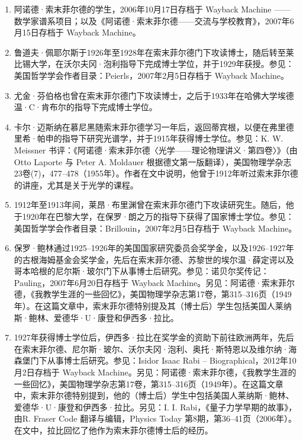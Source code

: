 \begin{enumerate}
\begin{itemize}
\item 博士与教授资格：卡尔·贝歇特、汉斯·贝特、彼得·德拜、保罗·彼得·埃瓦尔德、阿道夫·克拉策尔、威廉·伦茨、路德维希·瓦尔德曼、海因里希·韦尔克以及格雷戈尔·文策尔。
\item 教授资格：瓦尔特·科塞尔、马克斯·冯·劳厄以及沃伊切赫·鲁比诺维奇。
\item 博士后：威廉·阿利斯、博伊德·巴特利特、理查德·贝克尔、爱德华·康登、卡尔·埃卡特、威廉·V·休斯顿、埃德温·C·肯布尔、菲利普·M·莫尔斯、卡雷尔·尼森、莱纳斯·鲍林、伊西多·拉比、霍华德·罗伯逊以及弗里茨·绍特。
\item 亚琛本科生：瓦尔特·罗戈夫斯基。
\end{itemize}
\item 阿诺德·索末菲尔德的学生，2006年10月17日存档于 Wayback Machine —— 数学家谱系项目；以及《阿诺德·索末菲尔德——交流与学校教育》，2007年6月15日存档于 Wayback Machine。
\item 鲁道夫·佩耶尔斯于1926年至1928年在索末菲尔德门下攻读博士，随后转至莱比锡大学，在沃尔夫冈·泡利指导下完成博士学位，并于1929年获授。参见：美国哲学学会作者目录：Peierls，2007年2月5日存档于 Wayback Machine。
\item 尤金·芬伯格也曾在索末菲尔德门下攻读博士，之后于1933年在哈佛大学埃德温·C·肯布尔的指导下完成博士学位。
\item 卡尔·迈斯纳在慕尼黑随索末菲尔德学习一年后，返回蒂宾根，以便在弗里德里希·帕申的指导下研究光谱学，并于1915年获得博士学位。参见：K. W. Meissner 书评：《阿诺德·索末菲尔德〈光学——理论物理讲义·第四卷〉》（由 Otto Laporte 与 Peter A. Moldauer 根据德文第一版翻译），美国物理学杂志23卷(7)，477–478（1955年）。作者在文中说明，他曾于1912年听过索末菲尔德的讲座，尤其是关于光学的课程。
\item 1912年至1913年间，莱昂·布里渊曾在索末菲尔德门下攻读研究生。随后，他于1920年在巴黎大学，在保罗·朗之万的指导下获得了国家博士学位。参见：美国哲学学会作者目录：Brillouin，2007年2月5日存档于 Wayback Machine。
\item 保罗·鲍林通过1925–1926年的美国国家研究委员会奖学金，以及1926–1927年的古根海姆基金会奖学金，先后在索末菲尔德、苏黎世的埃尔温·薛定谔以及哥本哈根的尼尔斯·玻尔门下从事博士后研究。参见：诺贝尔奖传记：Pauling，2007年6月20日存档于 Wayback Machine。另见：阿诺德·索末菲尔德，《我教学生涯的一些回忆》，美国物理学杂志第17卷，第315–316页（1949年）。在这篇文章中，索末菲尔德特别提及其（博士后）学生包括美国人莱纳斯·鲍林、爱德华·U·康登和伊西多·拉比。
\item 1927年获得博士学位后，伊西多·拉比在奖学金的资助下前往欧洲两年，先后在索末菲尔德、尼尔斯·玻尔、沃尔夫冈·泡利、奥托·斯特恩以及维尔纳·海森堡门下从事博士后研究。参见：Isidor Isaac Rabi – Biographical，2012年10月2日存档于 Wayback Machine。另见：阿诺德·索末菲尔德，《我教学生涯的一些回忆》，美国物理学杂志第17卷，第315–316页（1949年）。在这篇文章中，索末菲尔德特别提到，他的（博士后）学生中包括美国人莱纳斯·鲍林、爱德华·U·康登和伊西多·拉比。另见：I. I. Rabi，《量子力学早期的故事》，由R. Fraser Code 翻译与编辑，Physics Today 第8期，第36–41页（2006年）。在文中，拉比回忆了他作为索末菲尔德博士后的经历。

\end{enumerate}

